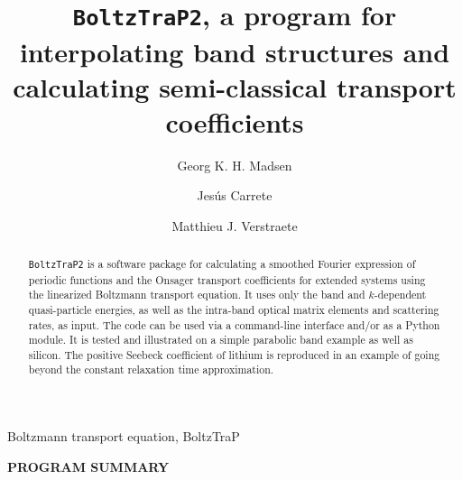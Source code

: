 \documentclass[final,5p,times,twocolumn,sort&compress]{elsarticle}
\begin{document}
\begin{frontmatter}

\title{\texttt{BoltzTraP2}, a program for interpolating band structures and calculating semi-classical transport coefficients}
\author[tuw]{Georg K. H. Madsen}
\author[tuw]{Jes\'us Carrete}
\author[uli]{Matthieu J. Verstraete}

\address[tuw]{Institute of Materials Chemistry, TU Wien, A-1060 Vienna, Austria}
\address[uli]{nanomat/QMAT/CESAM and Department of Physics, Universit\'e de Li\`ege, all\'ee du 6 ao\^ut, 19, B-4000 Li\`ege, Belgium.}

\begin{abstract}
\texttt{BoltzTraP2} is a software package for calculating a smoothed Fourier expression of periodic functions and the Onsager transport coefficients for extended systems using the linearized Boltzmann transport equation. It uses only the band and $k$-dependent quasi-particle energies, as well as the intra-band optical matrix elements and scattering rates, as input. The code can be used via a command-line interface and/or as a Python module. It is tested and illustrated on a simple parabolic band example as well as silicon. The positive Seebeck coefficient of lithium is reproduced in an example of going beyond the constant relaxation time approximation.
\end{abstract}

\begin{keyword}
  Boltzmann transport equation, BoltzTraP
\end{keyword}
\end{frontmatter}

{\bf PROGRAM SUMMARY}
\end{document}
